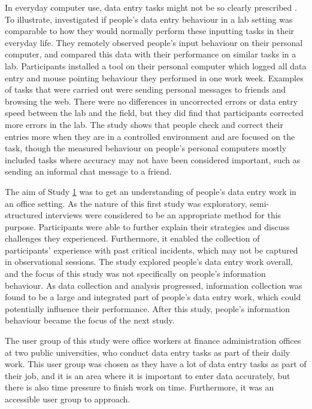 In everyday computer use, data entry tasks might not be so clearly prescribed \citep{Evans2012}. To illustrate, \citet{Evans2012} investigated if people's data entry behaviour in a lab setting was comparable to how they would normally perform these inputting tasks in their everyday life. They remotely observed people's input behaviour on their personal computer, and compared this data with their performance on similar tasks in a lab. Participants installed a tool on their personal computer which logged all data entry and mouse pointing behaviour they performed in one work week. Examples of tasks that were carried out were sending personal messages to friends and browsing the web. There were no differences in uncorrected errors or data entry speed between the lab and the field, but they did find that participants corrected more errors in the lab. The study shows that people check and correct their entries more when they are in a controlled environment and are focused on the task, though the measured behaviour on people's personal computers mostly included tasks where accuracy may not have been considered important, such as sending an informal chat message to a friend. 

The aim of Study \hyperref[st:Study1]{1} was to get an understanding of people's data entry work in an office setting. As the nature of this first study was exploratory, semi-structured interviews were considered to be an appropriate method for this purpose. Participants were able to further explain their strategies and discuss challenges they experienced. Furthermore, it enabled the collection of participants' experience with past critical incidents, which may not be captured in observational sessions. The study explored people's data entry work overall, and the focus of this study was not specifically on people's information behaviour. As data collection and analysis progressed, information collection was found to be a large and integrated part of people's data entry work, which could potentially influence their performance. After this study, people's information behaviour became the focus of the next study.

The user group of this study were office workers at finance administration offices at two public universities, who conduct data entry tasks as part of their daily work. This user group was chosen as they have a lot of data entry tasks as part of their job, and it is an area where it is important to enter data accurately, but there is also time pressure to finish work on time. Furthermore, it was an accessible user group to approach.

